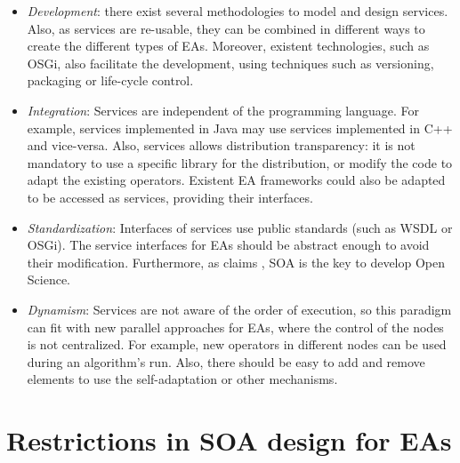 \begin{itemize}
\item {\em Development}: there exist several methodologies to model and design services. Also, as services are re-usable, they can be combined in different ways to create the different types of EAs. Moreover, existent technologies, such as OSGi, also facilitate the development, using techniques such as versioning, packaging or life-cycle control.
\item {\em Integration}: Services are independent of the programming language. For example, services implemented in Java may use services implemented in C++ and vice-versa. Also, services allows distribution transparency: it is not mandatory to use a specific library for the distribution, or modify the code to adapt the existing operators. Existent EA frameworks could also be adapted to be accessed as services, providing their interfaces. 
\item {\em Standardization}: Interfaces of services use public standards (such as WSDL or OSGi). The service interfaces for EAs should be abstract enough to avoid their modification. Furthermore, as  claims \cite{Foster2005Science}, SOA is the key to develop Open Science.
\item {\em Dynamism}: Services are not aware of the order of execution, so this paradigm can fit with new parallel approaches for EAs, where the control of the nodes is not centralized. For example, new operators in different nodes can be used during an algorithm's run. Also, there should be easy to add and remove elements to use the self-adaptation or other mechanisms.
\end{itemize} 










\section{Restrictions in SOA design for EAs}


